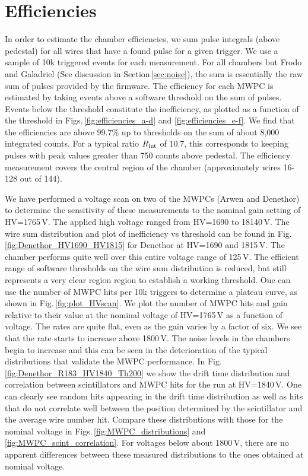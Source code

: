 \documentclass[12pt]{article}
\begin{document}
\section{Efficiencies \label{sec:eff}}
In order to estimate the chamber efficiencies, we sum pulse integrals (above pedestal) for all wires that have a found pulse for a given trigger. We use a sample of 10k triggered events for each measurement. For all chambers but Frodo and Galadriel (See discussion in Section\,\ref{sec:noise}), the sum is essentially the raw sum of pulses provided by the firmware. The efficiency for each MWPC is estimated by taking events above a software threshold on the sum of pulses. Events below the threshold constitute the inefficiency, as plotted as a function of the threshold in Figs.\,\ref{fig:efficiencies_a-d} and \ref{fig:efficiencies_e-f}. We find that the efficiencies are above 99.7\% up to thresholds on the sum of about 8,000 integrated counts. For a typical ratio $R_{\rm int}$ of 10.7, this corresponds to keeping pulses with peak values greater than 750 counts above pedestal. The efficiency measurement covers the central region of the chamber (approximately wires 16-128 out of 144). 

We have performed a voltage scan on two of the MWPCs (Arwen and Denethor) to determine the sensitivity of these measurements to the nominal gain setting of HV=1765\,V.  The applied high voltage ranged from HV=1690 to 18140\,V. The wire sum distribution and plot of inefficiency vs threshold can be found in 
Fig.\,\ref{fig:Denethor_HV1690_HV1815} 
for Denethor at HV=1690 and 1815\,V. The chamber performs quite well over this entire voltage range of 125\,V. The efficient range of software thresholds on the wire sum distribution is reduced, but still represents a very clear region region to establish a working threshold. One can use the number of MWPC hits per 10k triggers to determine a plateau curve, as shown in Fig.\,\ref{fig:plot_HVscan}. We plot the number of MWPC hits and gain relative to their value at the nominal voltage of HV=1765\,V as a function of voltage. The rates are quite flat, even as the gain varies by a factor of six. We see that the rate starts to increase above 1800\,V. The noise levels in the chambers begin to increase and this can be seen in the deterioration of the typical distributions that validate the MWPC performance. In  Fig.\,\ref{fig:Denethor_R183_HV1840_Th200} 
we show the drift time distribution and correlation between scintillators and MWPC hits for the run at HV=1840\,V. One can clearly see random hits appearing in the drift time distribution as well as hits that do not correlate well between the position determined by the scintillator and the average wire number hit. Compare these distributions with those for the nominal voltage in Figs.\,\ref{fig:MWPC_distributions} and \ref{fig:MWPC_scint_correlation}. For voltages below about 1800\,V, there are no apparent differences between these measured distributions to the ones obtained at nominal voltage. 
\end{document}
